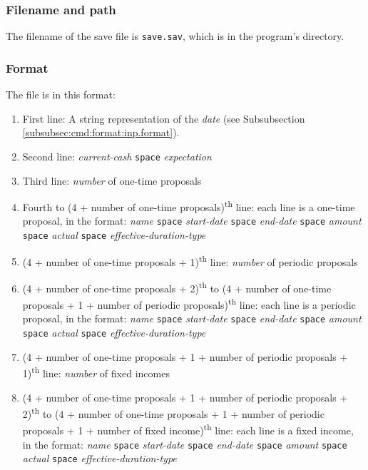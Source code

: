 \subsubsection{Filename and path}
The filename of the save file is \texttt{save.sav}, which is in the program's directory.

\subsubsection{Format}
The file is in this format:
\begin{enumerate}
	\item First line: A string representation of the \emph{date} (see Subsubsection \ref{subsubsec:cmd:format:inp.format}).
	\item Second line: \emph{current-cash} \texttt{space} \emph{expectation}
	\item Third line: \emph{number} of one-time proposals
	\item Fourth to (4 + number of one-time proposals)\textsuperscript{th} line: each line is a one-time proposal, in the format: \emph{name} \texttt{space} \emph{start-date} \texttt{space} \emph{end-date} \texttt{space} \emph{amount} \texttt{space} \emph{actual} \texttt{space} \emph{effective-duration-type} 
	\item (4 + number of one-time proposals + 1)\textsuperscript{th} line: \emph{number} of periodic proposals
	\item (4 + number of one-time proposals + 2)\textsuperscript{th} to (4 + number of one-time proposals + 1 + number of periodic proposals)\textsuperscript{th} line: each line is a periodic proposal, in the format: \emph{name} \texttt{space} \emph{start-date} \texttt{space} \emph{end-date} \texttt{space} \emph{amount} \texttt{space} \emph{actual} \texttt{space} \emph{effective-duration-type} 
	\item (4 + number of one-time proposals + 1 + number of periodic proposals + 1)\textsuperscript{th} line: \emph{number} of fixed incomes
	\item (4 + number of one-time proposals + 1 + number of periodic proposals + 2)\textsuperscript{th} to (4 + number of one-time proposals + 1 + number of periodic proposals + 1 + number of fixed income)\textsuperscript{th} line: each line is a fixed income, in the format: \emph{name} \texttt{space} \emph{start-date} \texttt{space} \emph{end-date} \texttt{space} \emph{amount} \texttt{space} \emph{actual} \texttt{space} \emph{effective-duration-type} 
\end{enumerate}

